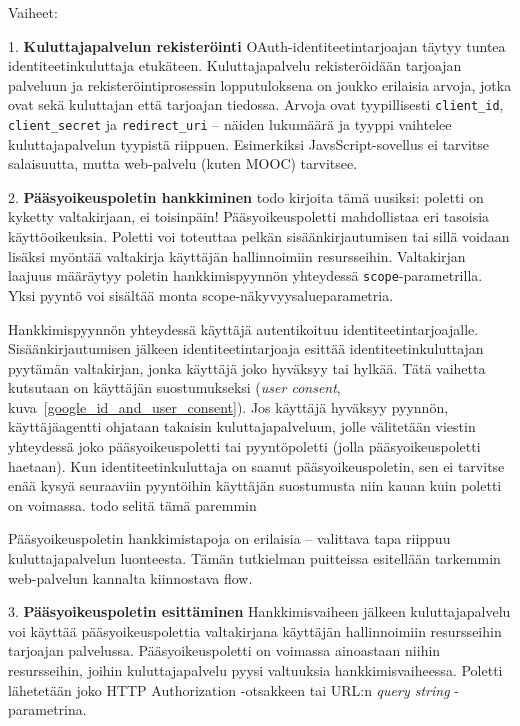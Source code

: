 \documentclass[finnish,gradu]{tktltiki}
\begin{document}
  Vaiheet:

  1. \textbf{Kuluttajapalvelun rekisteröinti} OAuth-identiteetintarjoajan täytyy tuntea identiteetinkuluttaja etukäteen. Kuluttajapalvelu rekisteröidään tarjoajan palveluun ja rekisteröintiprosessin lopputuloksena on joukko erilaisia arvoja, jotka ovat sekä kuluttajan että tarjoajan tiedossa. Arvoja ovat tyypillisesti \verb!client_id!, \verb!client_secret! ja \verb!redirect_uri! -- näiden lukumäärä ja tyyppi vaihtelee kuluttajapalvelun tyypistä riippuen. Esimerkiksi JavsScript-sovellus ei tarvitse salaisuutta, mutta web-palvelu (kuten MOOC) tarvitsee.

  2. \textbf{Pääsyoikeuspoletin hankkiminen}
  todo kirjoita tämä uusiksi: poletti on kyketty valtakirjaan, ei toisinpäin!
  Pääsyoikeuspoletti mahdollistaa eri tasoisia käyttöoikeuksia. Poletti voi toteuttaa pelkän sisäänkirjautumisen tai sillä voidaan lisäksi myöntää valtakirja käyttäjän hallinnoimiin resursseihin. Valtakirjan laajuus määräytyy poletin hankkimispyynnön yhteydessä \verb!scope!-parametrilla. Yksi pyyntö voi sisältää monta scope-näkyvyysalueparametria.

  Hankkimispyynnön yhteydessä käyttäjä autentikoituu identiteetintarjoajalle. Sisäänkirjautumisen jälkeen identiteetintarjoaja esittää identiteetinkuluttajan pyytämän valtakirjan, jonka käyttäjä joko hyväksyy tai hylkää. Tätä vaihetta kutsutaan on käyttäjän suostumukseksi (\emph{user consent}, kuva~\ref{google_id_and_user_consent}). Jos käyttäjä hyväksyy pyynnön, käyttäjäagentti ohjataan takaisin kuluttajapalveluun, jolle välitetään viestin yhteydessä joko pääsyoikeuspoletti tai pyyntöpoletti (jolla pääsyoikeuspoletti haetaan). Kun identiteetinkuluttaja on saanut pääsyoikeuspoletin, sen ei tarvitse enää kysyä seuraaviin pyyntöihin käyttäjän suostumusta niin kauan kuin poletti on voimassa. todo selitä tämä paremmin

  Pääsyoikeuspoletin hankkimistapoja on erilaisia -- valittava tapa riippuu kuluttajapalvelun luonteesta.
  Tämän tutkielman puitteissa esitellään tarkemmin web-palvelun kannalta kiinnostava flow.

  3. \textbf{Pääsyoikeuspoletin esittäminen}
  Hankkimisvaiheen jälkeen kuluttajapalvelu voi käyttää pääsyoikeuspolettia valtakirjana käyttäjän hallinnoimiin resursseihin tarjoajan palvelussa. Pääsyoikeuspoletti on voimassa ainoastaan niihin resursseihin, joihin kuluttajapalvelu pyysi valtuuksia hankkimisvaiheessa. Poletti lähetetään joko HTTP Authorization -otsakkeen tai URL:n \emph{query string} -parametrina.
\end{document}
